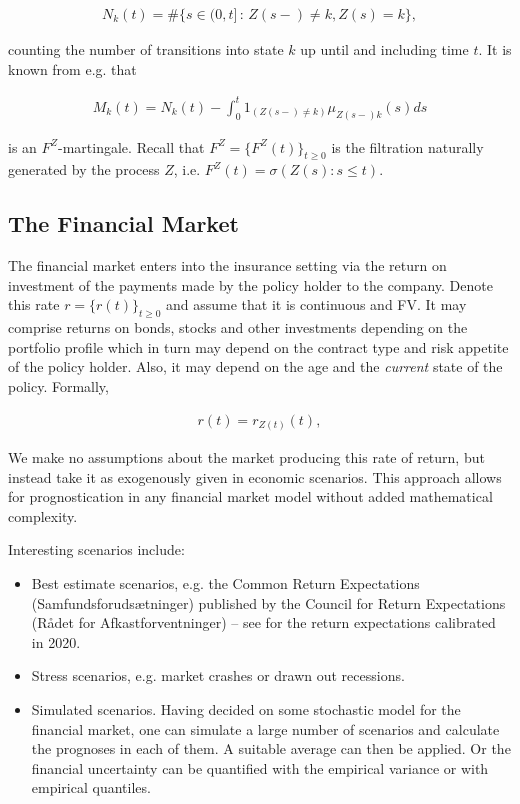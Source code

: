 \documentclass{article}
\newcommand{\1}[1]{\mathbbm{1}_{\left\lbrace #1 \right\rbrace}}
\theoremstyle{break}
\theoremstyle{remark}
\numberwithin{equation}{section}
\begin{document}
\begin{align*}
    N_{k}(t) = \# \{ s \in (0,t] \, : \, Z(s-) \neq k, Z(s)=k \},
\end{align*}

counting the number of transitions into state $k$ up until and including time $t$. It is known from e.g. \cite{LivStok} that

\begin{align*}
    M_{k}(t) = N_{k}(t) - \int_0^t 1_{( Z(s-) \neq k)} \mu_{Z(s-)k}(s)ds
\end{align*}

is an $F^Z$-martingale. Recall that $F^Z= \{ F^Z(t) \}_{t \geq 0}$ is the filtration naturally generated by the process $Z$, i.e. $F^Z(t) = \sigma(Z(s) : s \leq t)$.

\subsection{The Financial Market}

The financial market enters into the insurance setting via the return on investment of the payments made by the policy holder to the company. Denote this rate $r = \{ r(t) \}_{t \geq 0}$ and assume that it is continuous and FV. It may comprise returns on bonds, stocks and other investments depending on the portfolio profile which in turn may depend on the contract type and risk appetite of the policy holder. Also, it may depend on the age and the \textit{current} state of the policy. Formally,

\begin{align*}
	r(t) = r_{Z(t)}(t),
\end{align*}

We make no assumptions about the market producing this rate of return, but instead take it as exogenously given in economic scenarios. This approach allows for prognostication in any financial market model without added mathematical complexity.

Interesting scenarios include:

\begin{itemize}
	\item Best estimate scenarios, e.g. the Common Return Expectations (Samfundsforudsætninger) published by the Council for Return Expectations (Rådet for Afkastforventninger) -- see \cite{ReturnExpectations2020} for the return expectations calibrated in 2020.
	\item Stress scenarios, e.g. market crashes or drawn out recessions.
	\item Simulated scenarios. Having decided on some stochastic model for the financial market, one can simulate a large number of scenarios and calculate the prognoses in each of them. A suitable average can then be applied. Or the financial uncertainty can be quantified with the empirical variance or with empirical quantiles.
\end{itemize}
\end{document}
